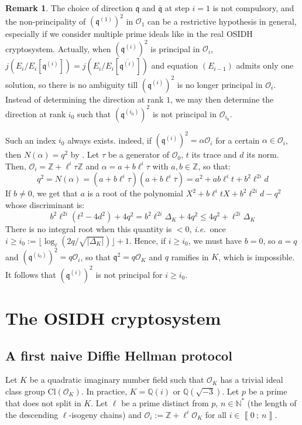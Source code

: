 \documentclass[a4paper,10pt]{report}
\theoremstyle{definition}
\theoremstyle{plain}
\theoremstyle{definition}
\newtheorem{remark}[definition]{Remark}
\newcommand{\ie}{\emph{i.e.}\ }
\newcommand{\N}{\mathbb{N}}
\newcommand{\Z}{\mathbb{Z}}
\newcommand{\Q}{\mathbb{Q}}
\newcommand{\mO}{\mathcal{O}}
\renewcommand{\i}[2]{\left\llbracket #1~;~#2\right\rrbracket}
\renewcommand{\(}{\left(}
\renewcommand{\)}{\right)}
\newcommand{\mfq}{\mathfrak{q}}
\begin{document}
\begin{remark}
The choice of direction $\mfq$ and $\overline{\mfq}$ at step $i=1$ is not compulsory, and the non-principality of $(\mfq^{(1)})^2$ in $\mO_1$ can be a restrictive hypothesis in general, especially if we consider multiple prime ideals like in the real OSIDH cryptosystem. Actually, when $(\mfq^{(i)})^2$ is principal in $\mO_i$, $j(E_i/E_i[\mfq^{(i)}])=j(E_i/E_i[\overline{\mfq^{(i)}}])$ and equation $(E_{i-1})$ admits only one solution, so there is no ambiguity till $(\mfq^{(i)})^2$ is no longer principal in $\mO_i$. Instead of determining the direction at rank $1$, we may then determine the direction at rank $i_0$ such that $(\mfq^{(i_0)})^2$ is not principal in $\mO_{i_0}$. 

Such an index $i_0$ always exists.  indeed, if $(\mfq^{(i)})^2=\alpha\mO_i$ for a certain $\alpha\in\mO_i$, then $N(\alpha)=q^2$ by \cite[lemma 7.14.(i)]{Cox}. Let $\tau$ be a generator of $\mO_0$, $t$ its trace and $d$ its norm. Then,  $\mO_i=\Z+\ell^i\tau\Z$ and $\alpha=a+b\ell^i\tau$ with $a, b\in\Z$, so that:
\[q^2=N(\alpha)=(a+b\ell^i\tau)(a+b\ell^i\overline{\tau})=a^2+ab\ell^it+b^2\ell^{2i}d\]
If $b\neq 0$, we get that $a$ is a root of the polynomial $X^2+b\ell^itX+b^2\ell^{2i}d-q^2$ whose discriminant is:
\[b^2\ell^{2i}(t^2-4d^2)+4q^2=b^2\ell^{2i}\Delta_K+4q^2\leq 4q^2+\ell^{2i}\Delta_K\]
There is no integral root when this quantity is $<0$, \ie once $i\geq i_0:=\lfloor \log_\ell(2q/\sqrt{|\Delta_K|})\rfloor +1$. Hence, if $i\geq i_0$, we must have $b=0$, so $a=q$ and $(\mfq^{(i_0)})^2=q\mO_i$, so that $\mfq^2=q\mO_K$ and $q$ ramifies in $K$, which is impossible. It follows that $(\mfq^{(i)})^2$ is not principal for $i\geq i_0$.
\end{remark}


\chapter{The OSIDH cryptosystem}

\section{A first naive Diffie Hellman protocol}\label{paragraph 15}

Let $K$ be a quadratic imaginary number field such that $\mO_K$ has a trivial ideal class group $\mbox{Cl}(\mO_K)$. In practice, $K=\Q(i)$ or $\Q(\sqrt{-3})$. Let $p$ be a prime that does not split in $K$. Let $\ell$ be a prime distinct from $p$, $n\in\N^*$ (the length of the descending $\ell$-isogeny chains) and $\mO_i:=\Z+\ell^i\mO_K$ for all $i\in\i{0}{n}$.
\end{document}
